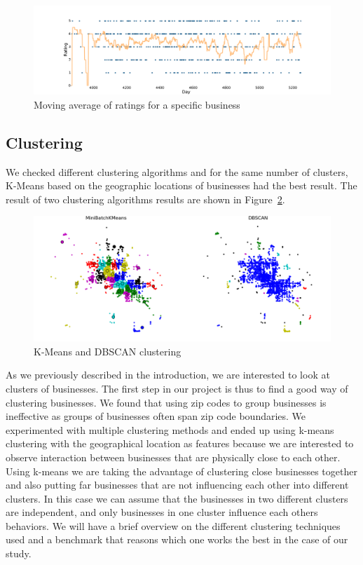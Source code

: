 \documentclass{vldb}
\begin{document}
\begin{figure}[h]
\centering
\includegraphics[width=\columnwidth]{moving_avg.pdf}
\caption{ Moving average of ratings for a specific business}
\label{fig:moving_average}
\end{figure}

\subsection{Clustering}
We checked different clustering algorithms and for the same number of clusters, K-Means based on the geographic locations of businesses had the best result. The result of two clustering algorithms results are shown in Figure~\ref{fig:clusters}.

\begin{figure}[h]
\centering
\includegraphics[width=\columnwidth]{clusters.png}
\caption{ K-Means and DBSCAN clustering}
\label{fig:clusters}
\end{figure}

As we previously described in the introduction, we are interested to look at clusters of businesses.
The first step in our project is thus to find a good way of clustering businesses.
We found that using zip codes to group businesses is ineffective as groups of businesses often span zip code boundaries.
We experimented with multiple clustering methods and ended up using k-means clustering with the geographical location as features because we are interested to observe interaction between businesses that are physically close to each other. Using k-means we are taking the advantage of clustering close businesses together and also putting far businesses that are not influencing each other into different clusters. In this case we can assume that the businesses in two different clusters are independent, and only businesses in one cluster influence each others behaviors. We will have a brief overview on the different clustering techniques used and a benchmark that reasons which one works the best in the case of our study.
\end{document}
